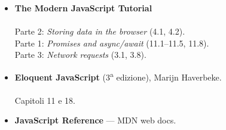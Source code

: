 \begin{itemize}
  \item \textbf{The Modern JavaScript Tutorial} \\
         \\
        Parte 2: \textit{Storing data in the browser} (4.1, 4.2). \\
        Parte 1: \textit{Promises and async/await} (11.1--11.5, 11.8). \\
        Parte 3: \textit{Network requests} (3.1, 3.8).
  \item \textbf{Eloquent JavaScript} (3\textsuperscript{a} edizione), Marijn
        Haverbeke. \\
         \\
        Capitoli 11 e 18.
  \item \textbf{JavaScript Reference} --- MDN web docs. \\
\end{itemize}
